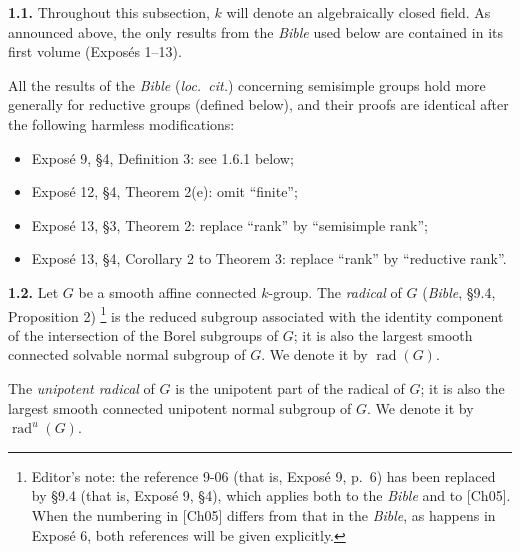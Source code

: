 
\noindent{}\textbf{1.1.}\quad
Throughout this subsection, \(k\) will denote an algebraically closed field.
As announced above, the only results from the \emph{Bible} used below are
contained in its first volume (Exposés 1--13).



All the results of the \emph{Bible} (\emph{loc.\ cit.}) concerning semisimple
groups hold more generally for reductive groups (defined below), and their
proofs are identical after the following harmless modifications:
\begin{itemize}
\item Exposé 9, §4, Definition 3: see 1.6.1 below;
\item Exposé 12, §4, Theorem 2(e): omit ``finite'';
\item Exposé 13, §3, Theorem 2: replace ``rank'' by ``semisimple rank'';
\item Exposé 13, §4, Corollary 2 to Theorem 3: replace ``rank'' by
  ``reductive rank''.
\end{itemize}

\noindent{}\textbf{1.2.}\quad
Let \(G\) be a smooth affine connected \(k\)-group.  The \emph{radical} of
\(G\) (\emph{Bible}, §9.4, Proposition 2)%
\footnote{Editor's note: the reference 9-06 (that is, Exposé 9, p.\ 6) has
been replaced by §9.4 (that is, Exposé 9, §4), which applies both to the
\emph{Bible} and to [Ch05].  When the numbering in [Ch05] differs from that
in the \emph{Bible}, as happens in Exposé 6, both references will be given
explicitly.}
is the reduced subgroup associated with the identity component of the
intersection of the Borel subgroups of \(G\); it is also the largest smooth
connected solvable normal subgroup of \(G\).  We denote it by
\(\operatorname{rad}(G)\).

The \emph{unipotent radical} of \(G\) is the unipotent part of the radical of
\(G\); it is also the largest smooth connected unipotent normal subgroup of
\(G\).  We denote it by \(\operatorname{rad}^{u}(G)\).

